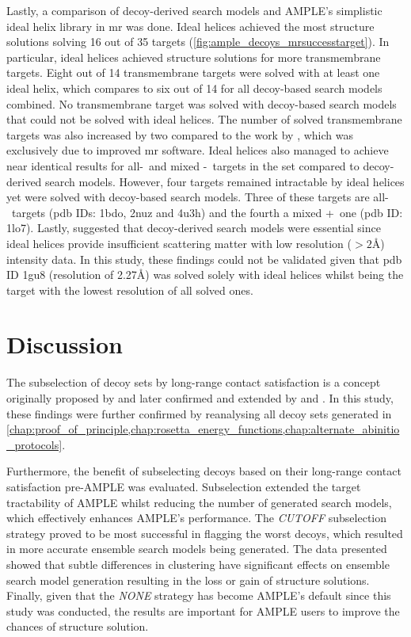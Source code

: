 Lastly, a comparison of decoy-derived search models and AMPLE's simplistic ideal helix library \cite{Thomas2015-wu} in \gls{mr} was done. Ideal helices achieved the most structure solutions solving 16 out of 35 targets (\cref{fig:ample_decoys_mrsuccesstarget}). In particular, ideal helices achieved structure solutions for more transmembrane targets. Eight out of 14 transmembrane targets were solved with at least one ideal helix, which compares to six out of 14 for all decoy-based search models combined. No transmembrane target was solved with decoy-based search models that could not be solved with ideal helices. The number of solved transmembrane targets was also increased by two compared to the work by \textcite{Thomas2017-sh}, which was exclusively due to improved \gls{mr} software. Ideal helices also managed to achieve near identical results for all-\textalpha\ and mixed \textalpha-\textbeta\ targets in the set compared to decoy-derived search models. However, four targets remained intractable by ideal helices yet were solved with decoy-based search models. Three of these targets are all-\textbeta\ targets (\gls{pdb} IDs: 1bdo, 2nuz and 4u3h) and the fourth a mixed \textalpha+\textbeta\ one (\gls{pdb} ID: 1lo7). Lastly, \textcite{Thomas2017-sh} suggested that decoy-derived search models were essential since ideal helices provide insufficient scattering matter with low resolution ($>2$\AA) intensity data. In this study, these findings could not be validated given that \gls{pdb} ID 1gu8 (resolution of 2.27\AA) was solved solely with ideal helices whilst being the target with the lowest resolution of all solved ones.

\section{Discussion}
The subselection of decoy sets by long-range contact satisfaction is a concept originally proposed by \textcite{Kosciolek2014-bt} and later confirmed and extended by \textcite{De_Oliveira2016-gj} and \textcite{Adhikari2018-lj}. In this study, these findings were further confirmed by reanalysing all decoy sets generated in \cref{chap:proof_of_principle,chap:rosetta_energy_functions,chap:alternate_abinitio_protocols}. 

Furthermore, the benefit of subselecting decoys based on their long-range contact satisfaction pre-AMPLE was evaluated. Subselection extended the target tractability of AMPLE whilst reducing the number of generated search models, which effectively enhances AMPLE's performance. The \textit{CUTOFF} subselection strategy proved to be most successful in flagging the worst decoys, which resulted in more accurate ensemble search models being generated. The data presented showed that subtle differences in clustering have significant effects on ensemble search model generation resulting in the loss or gain of structure solutions. Finally, given that the \textit{NONE} strategy has become AMPLE's default since this study was conducted, the results are important for AMPLE users to improve the chances of structure solution. 

